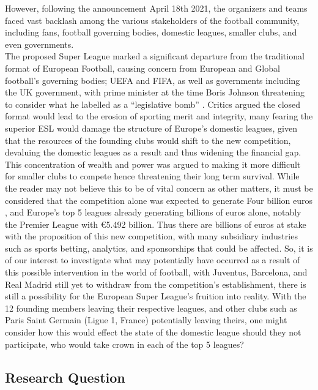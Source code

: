 \documentclass[
]{article}
\begin{document}
However, following the announcement April 18th 2021, the organizers and
teams faced vast backlash among the various stakeholders of the football
community, including fans, football governing bodies, domestic leagues,
smaller clubs, and even governments.\\
The proposed Super League marked a significant departure from the
traditional format of European Football, causing concern from European
and Global football's governing bodies; UEFA and FIFA, as well as
governments including the UK government, with prime minister at the time
Boris Johnson threatening to consider what he labelled as a
``legislative bomb'' . Critics argued the closed format would lead to
the erosion of sporting merit and integrity, many fearing the superior
ESL would damage the structure of Europe's domestic leagues, given that
the resources of the founding clubs would shift to the new competition,
devaluing the domestic leagues as a result and thus widening the
financial gap. This concentration of wealth and power was argued to
making it more difficult for smaller clubs to compete hence threatening
their long term survival. While the reader may not believe this to be of
vital concern as other matters, it must be considered that the
competition alone was expected to generate Four billion euros , and
Europe's top 5 leagues already generating billions of euros alone,
notably the Premier League with €5.492 billion. Thus there are billions
of euros at stake with the proposition of this new competition, with
many subsidiary industries such as sports betting, analytics, and
sponsorships that could be affected. So, it is of our interest to
investigate what may potentially have occurred as a result of this
possible intervention in the world of football, with Juventus,
Barcelona, and Real Madrid still yet to withdraw from the competition's
establishment, there is still a possibility for the European Super
League's fruition into reality. With the 12 founding members leaving
their respective leagues, and other clubs such as Paris Saint Germain
(Ligue 1, France) potentially leaving theirs, one might consider how
this would effect the state of the domestic league should they not
participate, who would take crown in each of the top 5 leagues?

\hypertarget{research-question}{%
\subsection{Research Question}\label{research-question}}
\end{document}
